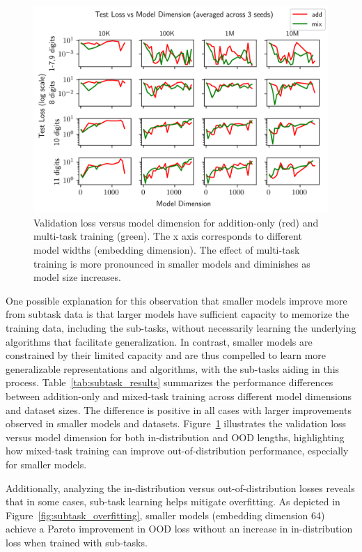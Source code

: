 \begin{figure}[!h]
  \centering
  \includegraphics[width=\textwidth]{fig/exp_27_test_loss_vs_n_embd.png}
  \caption{Validation loss versus model dimension for addition-only (red) and multi-task training (green). The x axis corresponds to different model widths (embedding dimension). The effect of multi-task training is more pronounced in smaller models and diminishes as model size increases.}
  \label{fig:exp_27_test_loss_vs_n_embd}
\end{figure}

One possible explanation for this observation that smaller models improve more from subtask data is that larger models have sufficient capacity to memorize the training data, including the sub-tasks, without necessarily learning the underlying algorithms that facilitate generalization. In contrast, smaller models are constrained by their limited capacity and are thus compelled to learn more generalizable representations and algorithms, with the sub-tasks aiding in this process. Table~\ref{tab:subtask_results} summarizes the performance differences between addition-only and mixed-task training across different model dimensions and dataset sizes. The difference is positive in all cases with larger improvements observed in smaller models and datasets. Figure~\ref{fig:exp_27_test_loss_vs_n_embd} illustrates the validation loss versus model dimension for both in-distribution and OOD lengths, highlighting how mixed-task training can improve out-of-distribution performance, especially for smaller models.

Additionally, analyzing the in-distribution versus out-of-distribution losses reveals that in some cases, sub-task learning helps mitigate overfitting. As depicted in Figure~\ref{fig:subtask_overfitting}, smaller models (embedding dimension 64) achieve a Pareto improvement in OOD loss without an increase in in-distribution loss when trained with sub-tasks.

